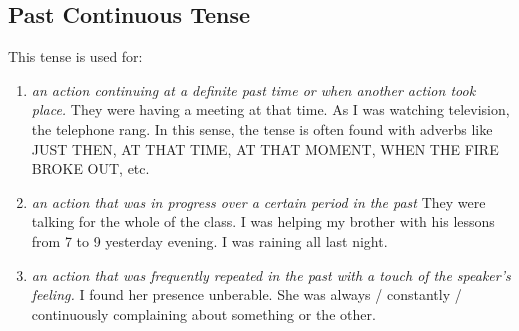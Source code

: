 \subsection{Past Continuous Tense}
This tense is used for:
\begin{enumerate}
    \item {\it an action continuing at a definite past time or when
        another action took place.}
        \newline
        \newline
        They were having a meeting at that time.
        As I was watching television, the telephone rang.
        \newline
        \newline
        In this sense, the tense is often found with adverbs like JUST THEN, AT
        THAT TIME, AT THAT MOMENT, WHEN THE FIRE BROKE OUT, etc.
    \item {\it an action that was in progress over a certain period in the
        past}
        \newline
        \newline
        They were talking for the whole of the class.
        \newline
        \newline
        I was helping my brother with his lessons from 7 to 9 yesterday evening.
        \newline
        \newline
        I was raining all last night.
    \item {\it an action that was frequently repeated in the past with a
        touch of the speaker's feeling.}
        \newline
        \newline
        I found her presence unberable. She was always / constantly /
        continuously complaining about something or the other.
\end{enumerate}

